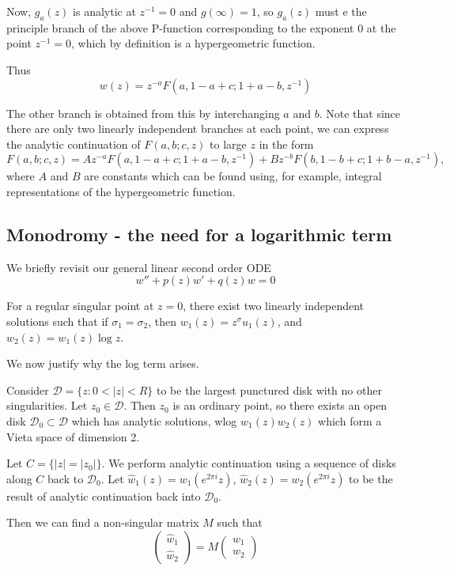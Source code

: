 \documentclass[a4paper]{article}
\begin{document}
Now, $g_a(z)$ is analytic at $z^{-1} = 0$ and $g(\infty) = 1$, so $g_a(z)$ must e the principle branch of the above P-function corresponding to the exponent 0 at the point $z^{-1} = 0$, which by definition is a hypergeometric function.

Thus
\[
	w(z) = z^{-a} F(a, 1-a+c; 1+a-b, z^{-1})
\] 

The other branch is obtained from this by interchanging $a$ and $b$. Note that since there are only two linearly independent branches at each point, we can express the analytic continuation of $F(a, b; c,z)$ to large $z$ in the form
\[
	F(a, b; c, z) = A z^{-a}F(a, 1-a+c; 1+a-b, z^{-1}) + B z^{-b} F(b, 1-b+c; 1+b-a, z^{-1})
,\] where $A$ and $B$ are constants which can be found using, for example, integral representations of the hypergeometric function. 

\subsection{Monodromy - the need for a logarithmic term}

We briefly revisit our general linear second order ODE
\[
	w'' + p(z)w' + q(z)w = 0 
\] 

For a regular singular point at $z=0$, there exist two linearly independent solutions such that if $\sigma_1 = \sigma_2$, then $w_1(z) = z^{\sigma} u_1(z)$, and $w_2(z) = w_1(z) \log z$.

We now justify why the log term arises.

Consider $\mathcal{D} = \{z: 0 < |z| < R\} $ to be the largest punctured disk with no other singularities. Let $z_0 \in \mathcal{D}$. Then $z_0$ is an ordinary point, so there exists an open disk $\mathcal{D}_0 \subset \mathcal{D}$ which has analytic solutions, wlog $w_1(z) w_2(z)$ which form a Vieta space of dimension 2.

Let $C = \{|z| = |z_0|\} $. We perform analytic continuation using a sequence of disks along $C$ back to $\mathcal{D}_0$. Let $\hat{w}_{1}(z) = w_1\left( e^{2\pi i }z \right) $, $\hat{w}_2(z) = w_2\left( e^{2\pi i } z \right) $ to be the result of analytic continuation back into $\mathcal{D}_0$.

Then we can find a non-singular matrix  $M$ such that
\[
\begin{pmatrix} \hat{w}_1 \\ \hat{w}_2 \end{pmatrix} = M \begin{pmatrix} w_1 \\ w_2 \end{pmatrix} 
\] 
\end{document}
